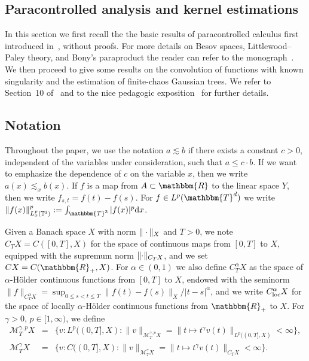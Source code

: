 \begin{appendices}

\section{Paracontrolled analysis and kernel
estimations}\label{a:basics}

In this section we first recall the the basic results of paracontrolled
calculus first introduced in~{\cite{gubinelli_paracontrolled_2012}}, without
proofs. For more details on Besov spaces, Littlewood--Paley theory, and Bony's
paraproduct the reader can refer to the monograph~{\cite{Bahouri2011}}. We
then proceed to give some results on the convolution of functions with known
singularity and the estimation of finite-chaos Gaussian trees. We refer to
Section~10 of~{\cite{hairer_theory_2014}} and to the nice pedagogic
exposition~{\cite{mourrat_construction_2016}} for further details.

\subsection{Notation}\label{s:notations}

Throughout the paper, we use the notation $a \lesssim b$ if there exists a
constant $c > 0$, independent of the variables under consideration, such that
$a \leqslant c \cdot b$. If we want to emphasize the dependence of $c$ on the
variable $x$, then we write $a (x) \lesssim_x b (x)$. If $f$ is a map from $A
\subset \mathbbm{R}$ to the linear space $Y$, then we write $f_{s, t} = f (t)
- f (s)$. For $f \in L^p (\mathbbm{T}^d)$ we write $\|f (x)\|^p_{L^p_x
(\mathbb{T}^3)} \assign \int_{\mathbbm{T}^3} |f (x) |^p \mathd x$.

Given a Banach space $X$ with norm $\| \cdot \|_X$ and $T > 0$, we note $C_T
X = C ([0, T], X)$ for the space of continuous maps from $[0, T]$ to $X$,
equipped with the supremum norm $\lVert \cdot \rVert_{C_T X}$, and we set $C
X = C (\mathbbm{R}_+, X)$. For $\alpha \in (0, 1)$ we also define
$C^{\alpha}_T X$ as the space of $\alpha$-H{\"o}lder continuous functions from
$[0, T]$ to $X$, endowed with the seminorm $\|f\|_{C^{\alpha}_T X} = \sup_{0
\leqslant s < t \leqslant T} \|f (t) - f (s)\|_X / |t - s|^{\alpha}$, and we
write $C^{\alpha}_{\operatorname{loc}} X$ for the space of locally $\alpha$-H{\"o}lder
continuous functions from $\mathbbm{R}_+$ to $X$. For $\gamma > 0$, $p \in [1,
\infty)$, we define
\begin{equation}
  \begin{array}{lll}
    \mathcal{M}^{\gamma, p}_T X & = & \{ v : L^p ((0, T], X) : \| v
    \|_{\mathcal{M}^{\gamma, p}_T X} = \| t \mapsto t^{\gamma} v (t) \|_{L^p
    ((0, T], X)} < \infty \},\\
    \mathcal{M}^{\gamma}_T X & = & \{ v : C ((0, T], X) : \| v
    \|_{\mathcal{M}^{\gamma}_T X} = \| t \mapsto t^{\gamma} v (t) \|_{C_T X} <
    \infty \} .
  \end{array} \label{e:expl-space-def}
\end{equation}



\end{appendices}
